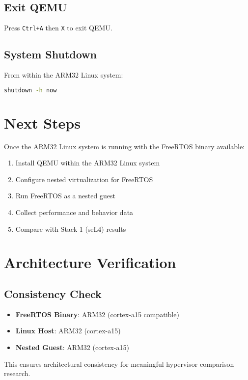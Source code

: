 \documentclass{article}
\begin{document}
\subsection{Exit QEMU}
Press \texttt{Ctrl+A} then \texttt{X} to exit QEMU.

\subsection{System Shutdown}
From within the ARM32 Linux system:
\begin{lstlisting}[language=bash]
shutdown -h now
\end{lstlisting}

\section{Next Steps}

Once the ARM32 Linux system is running with the FreeRTOS binary available:

\begin{enumerate}
    \item Install QEMU within the ARM32 Linux system
    \item Configure nested virtualization for FreeRTOS
    \item Run FreeRTOS as a nested guest
    \item Collect performance and behavior data
    \item Compare with Stack 1 (seL4) results
\end{enumerate}

\section{Architecture Verification}

\subsection{Consistency Check}
\begin{itemize}
    \item \textbf{FreeRTOS Binary}: ARM32 (cortex-a15 compatible)
    \item \textbf{Linux Host}: ARM32 (cortex-a15)
    \item \textbf{Nested Guest}: ARM32 (cortex-a15)
\end{itemize}

This ensures architectural consistency for meaningful hypervisor comparison research.
\end{document}
